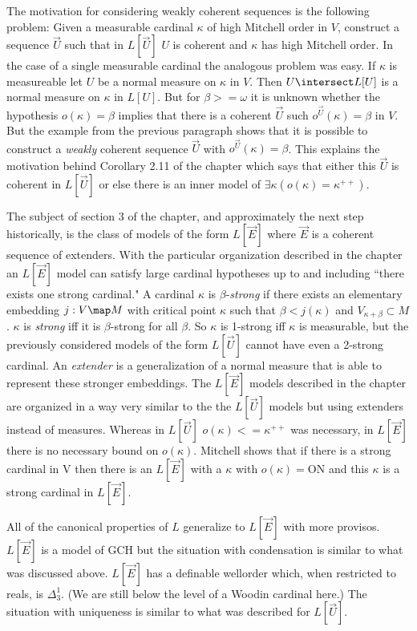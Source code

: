 \documentclass[oneside,12pt]{amsart}
\begin{document}
The motivation for considering weakly coherent sequences is the following problem:
Given a measurable cardinal $\kappa$ of high Mitchell order in $V$, construct a sequence $\vec{U}$ such that
in $L[\vec{U}]$ $U$ is coherent and $\kappa$ has high Mitchell order. In the case of
a single measurable cardinal the analogous problem was easy. If $\kappa$ is measureable let $U$ be a normal
measure on $\kappa$ in $V$. Then $U\intersect L[U]$ is a normal measure on $\kappa$ in
$L[U]$. But for $\beta>=\omega$ it is unknown whether the hypothesis $o(\kappa) = \beta$
implies that there is a coherent $\vec{U}$ such $o^{\vec{U}}(\kappa) = \beta$ in $V$.
But the example from the previous paragraph shows that it is possible to construct a \emph{weakly} coherent
sequence $\vec{U}$ with $o^{\vec{U}}(\kappa) = \beta$.
This explains the motivation behind Corollary 2.11 of the chapter which says that either
this $\vec{U}$ is coherent in $L[\vec{U}]$ or else there is an inner model
of $\exists \kappa (o(\kappa) = \kappa^{++})$.

The subject of section 3 of the chapter, and approximately the next step historically, is the
class of models of the form $L[\vec{E}]$ where $\vec{E}$ is a coherent sequence of
extenders. With the particular organization described in the chapter an $L[\vec{E}]$
model can satisfy large cardinal hypotheses up to and including ``there exists
one strong cardinal." A cardinal $\kappa$ is $\beta$-\emph{strong} if there exists
an elementary embedding $j:V\map M$ with critical point $\kappa$ such that
$\beta<j(\kappa)$ and $V_{\kappa+\beta}\subset M$. $\kappa$ is \emph{strong} iff it is
$\beta$-strong for all $\beta$. So $\kappa$ is 1-strong iff $\kappa$ is
measurable, but the previously considered models of the form $L[\vec{U}]$ cannot have
even a 2-strong cardinal. An \emph{extender} is a generalization of a normal measure
that is able to represent these stronger embeddings. The $L[\vec{E}]$ models described
in the chapter are organized in a way very similar to the the $L[\vec{U}]$ models
but using extenders instead of measures. Whereas in $L[\vec{U}]$
$o(\kappa) <= \kappa^{++}$ was necessary, in $L[\vec{E}]$ there is no necessary
bound on $o(\kappa)$. Mitchell shows that if there is a strong cardinal in V then
there is an $L[\vec{E}]$ with a $\kappa$ with $o(\kappa) = \text{ON}$ and this $\kappa$
is a strong cardinal in $L[\vec{E}]$.

All of the canonical properties
of $L$ generalize to $L[\vec{E}]$ with more provisos.
$L[\vec{E}]$ is a model of GCH but the situation with condensation is similar
to what was discussed above. $L[\vec{E}]$ has a definable wellorder
which, when restricted to reals, is $\Delta^1_3$. (We are still below the
level of a Woodin cardinal here.) The situation with uniqueness is similar
to what was described for $L[\vec{U}]$.
\end{document}
